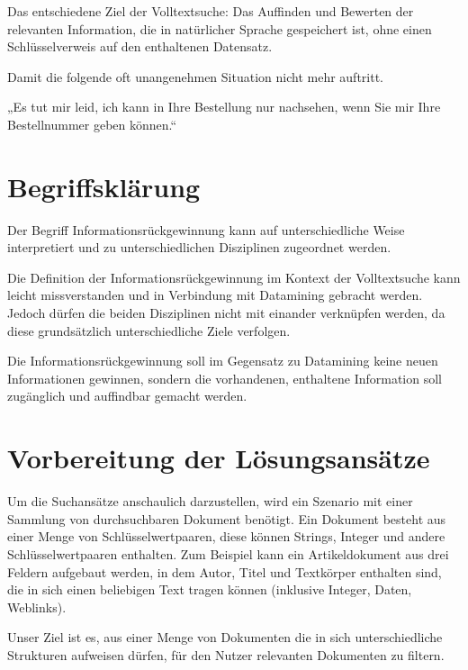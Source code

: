 Das entschiedene Ziel der Volltextsuche: Das Auffinden und Bewerten der
relevanten Information, die in natürlicher Sprache gespeichert ist,
ohne einen Schlüsselverweis auf den enthaltenen Datensatz. 

Damit die folgende oft unangenehmen Situation nicht mehr auftritt.




„Es tut mir leid, ich kann in Ihre Bestellung nur nachsehen, wenn Sie
mir Ihre Bestellnummer geben können.“




\section[Begriffsklärung]{Begriffsklärung}



Der Begriff Informationsrückgewinnung kann auf unterschiedliche Weise
interpretiert und zu unterschiedlichen Disziplinen zugeordnet werden. 

Die Definition der Informationsrückgewinnung im Kontext der
Volltextsuche kann leicht missverstanden und in Verbindung mit
Datamining gebracht werden. Jedoch dürfen die beiden Disziplinen nicht
mit einander verknüpfen werden, da diese grundsätzlich unterschiedliche
Ziele verfolgen.

Die Informationsrückgewinnung soll im Gegensatz zu Datamining keine
neuen Informationen gewinnen, sondern die vorhandenen, enthaltene
Information soll zugänglich und auffindbar gemacht werden.




\section[Vorbereitung der Lösungsansätze]{Vorbereitung der
Lösungsansätze}



Um die Suchansätze anschaulich darzustellen, wird ein Szenario mit einer
Sammlung von durchsuchbaren Dokument benötigt. Ein Dokument besteht aus
einer Menge von Schlüsselwertpaaren, diese können Strings, Integer und
andere Schlüsselwertpaaren enthalten. Zum Beispiel kann ein
Artikeldokument aus drei Feldern aufgebaut werden, in dem Autor, Titel
und Textkörper enthalten sind, die in sich einen beliebigen Text tragen
können (inklusive Integer, Daten, Weblinks). 

Unser Ziel ist es, aus einer Menge von Dokumenten die in sich
unterschiedliche Strukturen aufweisen dürfen, für den Nutzer relevanten
Dokumenten zu filtern.




